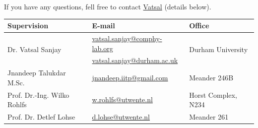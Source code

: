 \documentclass[a4paper,10pt]{article}
\begin{document}
If you have any questions, fell free to contact \href{mailto:vatsal.sanjay@comphy-lab.org}{Vatsal} (details below).
\begin{center}
\begin{tabular}{|l|l|l|}
\hline \textbf{Supervision} & \textbf{E-mail} & \textbf{Office} \\
\hline \multirow{2}{*}{Dr. Vatsal Sanjay} & \href{mailto:vatsal.sanjay@comphy-lab.org}{vatsal.sanjay@comphy-lab.org} & \multirow{2}{*}{Durham University} \\
& \href{mailto:vatsal.sanjay@durham.ac.uk}{vatsal.sanjay@durham.ac.uk} & \\
\hline Jnandeep Talukdar M.Sc. & \href{mailto:jnandeep.iitp@gmail.com}{jnandeep.iitp@gmail.com} & Meander 246B \\
\hline Prof. Dr.-Ing. Wilko Rohlfs   & \href{mailto:w.rohlfs@utwente.nl}{w.rohlfs@utwente.nl}& Horst Complex, N234 \\
\hline Prof. Dr. Detlef Lohse & \href{mailto:d.lohse@utwente.nl}{d.lohse@utwente.nl} & Meander 261  \\
\hline
\end{tabular}
\end{center}

\printbibliography
\end{document}
